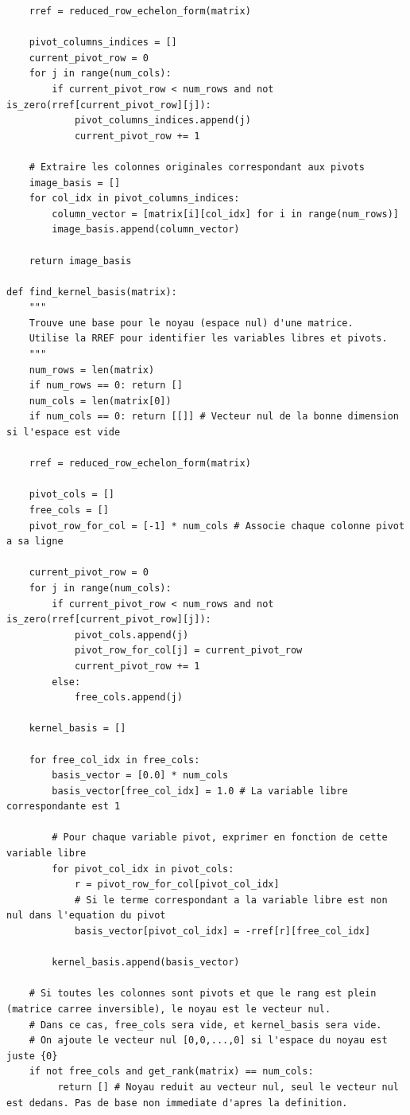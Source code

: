 \documentclass{report}
\begin{document}
\begin{verbatim}
    rref = reduced_row_echelon_form(matrix)

    pivot_columns_indices = []
    current_pivot_row = 0
    for j in range(num_cols):
        if current_pivot_row < num_rows and not is_zero(rref[current_pivot_row][j]):
            pivot_columns_indices.append(j)
            current_pivot_row += 1

    # Extraire les colonnes originales correspondant aux pivots
    image_basis = []
    for col_idx in pivot_columns_indices:
        column_vector = [matrix[i][col_idx] for i in range(num_rows)]
        image_basis.append(column_vector)

    return image_basis

def find_kernel_basis(matrix):
    """
    Trouve une base pour le noyau (espace nul) d'une matrice.
    Utilise la RREF pour identifier les variables libres et pivots.
    """
    num_rows = len(matrix)
    if num_rows == 0: return []
    num_cols = len(matrix[0])
    if num_cols == 0: return [[]] # Vecteur nul de la bonne dimension si l'espace est vide

    rref = reduced_row_echelon_form(matrix)

    pivot_cols = []
    free_cols = []
    pivot_row_for_col = [-1] * num_cols # Associe chaque colonne pivot a sa ligne

    current_pivot_row = 0
    for j in range(num_cols):
        if current_pivot_row < num_rows and not is_zero(rref[current_pivot_row][j]):
            pivot_cols.append(j)
            pivot_row_for_col[j] = current_pivot_row
            current_pivot_row += 1
        else:
            free_cols.append(j)

    kernel_basis = []

    for free_col_idx in free_cols:
        basis_vector = [0.0] * num_cols
        basis_vector[free_col_idx] = 1.0 # La variable libre correspondante est 1

        # Pour chaque variable pivot, exprimer en fonction de cette variable libre
        for pivot_col_idx in pivot_cols:
            r = pivot_row_for_col[pivot_col_idx]
            # Si le terme correspondant a la variable libre est non nul dans l'equation du pivot
            basis_vector[pivot_col_idx] = -rref[r][free_col_idx]

        kernel_basis.append(basis_vector)

    # Si toutes les colonnes sont pivots et que le rang est plein (matrice carree inversible), le noyau est le vecteur nul.
    # Dans ce cas, free_cols sera vide, et kernel_basis sera vide.
    # On ajoute le vecteur nul [0,0,...,0] si l'espace du noyau est juste {0}
    if not free_cols and get_rank(matrix) == num_cols:
         return [] # Noyau reduit au vecteur nul, seul le vecteur nul est dedans. Pas de base non immediate d'apres la definition.


\end{verbatim}
\end{document}
